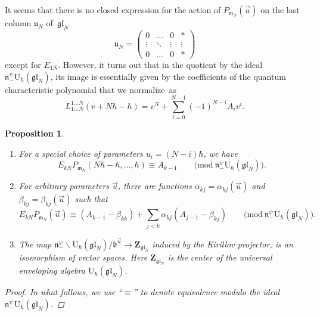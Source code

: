 \documentclass[pdftex]{sigma}
\numberwithin{equation}{section}
\newtheorem{Proposition}[Theorem]{Proposition}
{ \theoremstyle{definition}
	\newtheorem{Definition}[Theorem]{Definition}
	\newtheorem{Note}[Theorem]{Note}
	\newtheorem{Example}[Theorem]{Example}
	\newtheorem{Remark}[Theorem]{Remark} }
\newcommand{\U}{\mathrm{U}_{\hbar}}
\newcommand{\Z}{\mathbf{Z}}
\renewcommand{\b}{\mathfrak{b}}
\newcommand{\n}{\mathfrak{n}}
\renewcommand{\u}{\mathfrak{u}}
\newcommand{\m}{\mathfrak{m}}
\newcommand{\gl}{\mathfrak{gl}}
\begin{document}
	
	It seems that there is no closed expression for the action of $P_{\m_N}(\vec{u})$ on the last column $\u_N$ of~$\gl_N$
	\[
	\u_N = \begin{pmatrix}
		0 & \dots & 0 & * \\
		\vdots & \ddots & \vdots & \vdots \\
		0 & \dots & 0 & *
	\end{pmatrix}
	\]
	except for $E_{1N}$. However, it turns out that in the quotient by the ideal $\n_-^{\psi} \U(\gl_N)$, its image is essentially given by the coefficients of the quantum characteristic polynomial that we normalize~as
	\[%
		L_{1\dots N}^{1\dots N}(v+N\hbar - \hbar) = v^N + \sum_{i=0}^{N-1} (-1)^{N-i} A_i v^i.
	\]
	\begin{Proposition}\quad
		\label{prop::last_col_center_iso}
		\begin{enumerate}\itemsep=0pt
			\item[$(1)$] For a special choice of parameters $u_i = (N-i)\hbar$, we have
			\[
			E_{kN} P_{\m_N}(N\hbar-\hbar,\dots,\hbar) \equiv A_{k-1} \qquad \bigl(\mathrm{mod}\ \n_-^{\psi} \U(\gl_N)\bigr).
			\]
			
			\item[$(2)$] For arbitrary parameters $\vec{u}$, there are functions $\alpha_{kj} = \alpha_{kj}(\vec{u})$ and $\beta_{kj} = \beta_{kj}(\vec{u})$ such that
			\[
			E_{kN} P_{\m_N} (\vec{u}) \equiv (A_{k-1} - \beta_{kk}) + \sum_{j < k} \alpha_{kj} (A_{j-1}-\beta_{kj}) \qquad \bigl(\mathrm{mod}\ \n_-^{\psi} \U(\gl_N)\bigr).
			\]
			
			\item[$(3)$] The map
			$
				\n_-^{\psi} \backslash \U(\gl_N) / \b^{\vec{u}} \rightarrow \Z_{\gl_N}$
			induced by the Kirillov projector, is an isomorphism of vector spaces. Here $\Z_{\gl_N}$ is the center of the universal enveloping algebra $\U(\gl_N)$.
		\end{enumerate}
		
		\begin{proof}
			In what follows, we use ``$\equiv$'' to denote equivalence modulo the ideal $\n_-^{\psi} \U(\gl_N)$.
			

\end{proof}
\end{Proposition}
\end{document}
